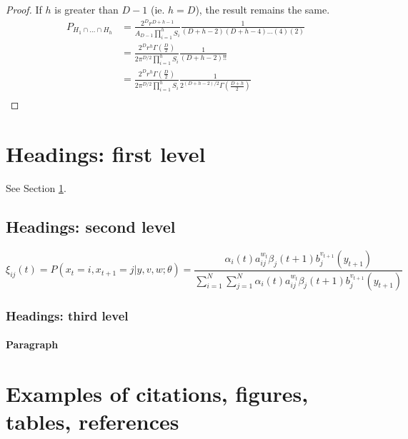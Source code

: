 \documentclass{article}
\begin{document}
\begin{proof}
	If $h$ is greater than $D-1$ (ie. $h=D$), the result remains the same.
	\begin{align}
		P_{H_1\cap\hdots\cap H_h} &= \frac{2^Dr^{D+h-1}}{A_{D-1}\prod_{i=1}^h S_i}  \frac{1}{(D+h-2)(D+h-4)\hdots(4)(2)}  \\
		&= \frac{2^Dr^{h} \Gamma(\frac{D}{2})}{2 \pi^{D/2} \prod_{i=1}^h S_i} \frac{1}{(D+h-2)!!} \\
		&= \frac{2^Dr^{h} \Gamma(\frac{D}{2})}{2 \pi^{D/2} \prod_{i=1}^h S_i} \frac{1}{2^{(D+h-2)/2} \Gamma(\frac{D+h}{2})} \\
	\end{align}


\end{proof}

\section{Headings: first level}
\label{sec:headings}

\lipsum[4] See Section \ref{sec:headings}.

\subsection{Headings: second level}
\lipsum[5]
\begin{equation} 
	\xi _{ij}(t)=P(x_{t}=i,x_{t+1}=j|y,v,w;\theta)= {\frac {\alpha _{i}(t)a^{w_t}_{ij}\beta _{j}(t+1)b^{v_{t+1}}_{j}(y_{t+1})}{\sum _{i=1}^{N} \sum _{j=1}^{N} \alpha _{i}(t)a^{w_t}_{ij}\beta _{j}(t+1)b^{v_{t+1}}_{j}(y_{t+1})}}
\end{equation}



\subsubsection{Headings: third level}
\lipsum[6]

\paragraph{Paragraph}
\lipsum[7]



\section{Examples of citations, figures, tables, references}
\label{sec:others}
\end{document}
